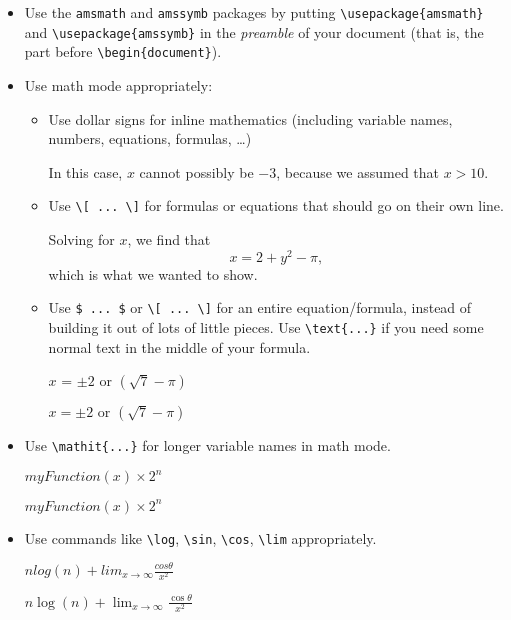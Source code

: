 \documentclass{article}
\begin{document}
\begin{itemize}
\item Use the \texttt{amsmath} and \texttt{amssymb} packages by
  putting \verb|\usepackage{amsmath}| and \verb|\usepackage{amssymb}|
  in the \emph{preamble} of your document (that is, the part before
  \verb|\begin{document}|).
\item Use math mode appropriately:
  \begin{itemize}
  \item Use dollar signs for inline mathematics (including variable
    names, numbers, equations, formulas, \dots)
    \begin{good}
In this case, $x$ cannot possibly be $-3$, because we assumed that $x > 10$.
    \end{good}
  \item Use \verb|\[ ... \]| for formulas or equations that should go
    on their own line.
    \begin{good}
Solving for $x$, we find that \[ x = 2 + y^2 - \pi, \] which is what we wanted to show.
    \end{good}
 \item Use \verb|$ ... $| or \verb|\[ ... \]| for an entire
   equation/formula, instead of building it out of lots of little
   pieces. Use \verb|\text{...}| if you need some normal text in the
     middle of your formula.
   \begin{bad}
$x$ = $\pm 2$ or $(\sqrt{7} - \pi)$
   \end{bad}
   \begin{good}
$x = \pm 2 \text{ or } (\sqrt{7} - \pi)$
   \end{good}
  \end{itemize}
\item Use \verb|\mathit{...}| for longer variable names in math mode.
  \begin{bad}
$myFunction(x) \times 2^n$
  \end{bad}
  \begin{good}
$\mathit{myFunction}(x) \times 2^n$
  \end{good}
\item Use commands like \verb|\log|, \verb|\sin|, \verb|\cos|,
  \verb|\lim| appropriately.
  \begin{bad}
$n log(n) + lim_{x \to \infty} \frac{cos \theta}{x^2}$
  \end{bad}
  \begin{good}
$n \log(n) + \lim_{x \to \infty} \frac{\cos \theta}{x^2}$
  \end{good}

\end{itemize}
\end{document}
